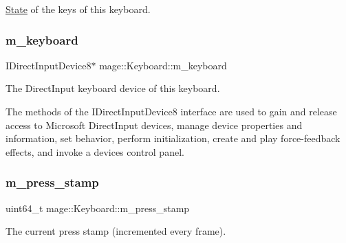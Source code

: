 \hyperlink{classmage_1_1_state}{State} of the keys of this keyboard. \hypertarget{classmage_1_1_keyboard_ae1325369d4863cc36ec1a0359dbf27fb}{}\label{classmage_1_1_keyboard_ae1325369d4863cc36ec1a0359dbf27fb} 
\subsubsection{\texorpdfstring{m\+\_\+keyboard}{m\_keyboard}}
{\footnotesize\ttfamily I\+Direct\+Input\+Device8$\ast$ mage\+::\+Keyboard\+::m\+\_\+keyboard\hspace{0.3cm}{\ttfamily [protected]}}

The Direct\+Input keyboard device of this keyboard.

The methods of the I\+Direct\+Input\+Device8 interface are used to gain and release access to Microsoft Direct\+Input devices, manage device properties and information, set behavior, perform initialization, create and play force-\/feedback effects, and invoke a device\textquotesingle{}s control panel. \hypertarget{classmage_1_1_keyboard_a2c638a93d1f61d9d3578a0df8b6a1c39}{}\label{classmage_1_1_keyboard_a2c638a93d1f61d9d3578a0df8b6a1c39} 
\subsubsection{\texorpdfstring{m\+\_\+press\+\_\+stamp}{m\_press\_stamp}}
{\footnotesize\ttfamily uint64\+\_\+t mage\+::\+Keyboard\+::m\+\_\+press\+\_\+stamp\hspace{0.3cm}{\ttfamily [protected]}}

The current press stamp (incremented every frame). 